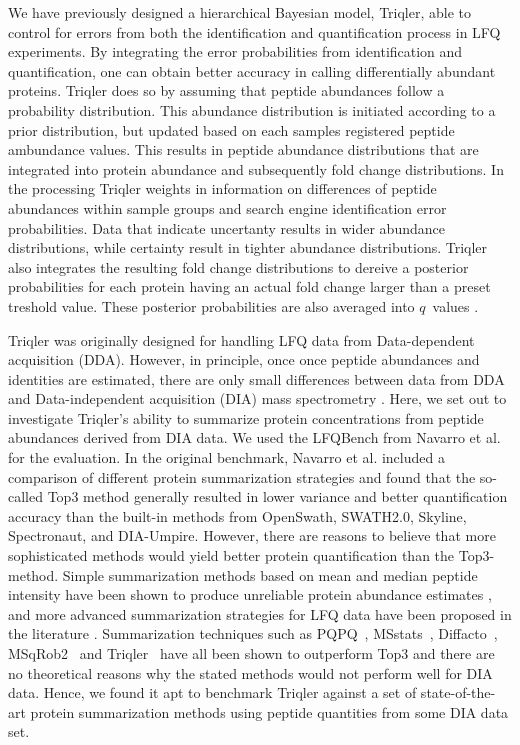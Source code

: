 \documentclass[10pt,letterpaper]{article}
\begin{document}
We have previously designed a hierarchical Bayesian model, Triqler, able to control for errors from both the identification and quantification process in LFQ experiments\cite{the2019integrated}. By integrating the error probabilities from identification and quantification, one can obtain better accuracy in calling differentially abundant proteins. Triqler does so by assuming that peptide abundances follow a probability distribution. This abundance distribution is initiated according to a prior distribution, but updated based on each samples registered peptide ambundance values. This results in peptide abundance distributions that are integrated into protein abundance and subsequently fold change distributions. In the processing Triqler weights in information on differences of peptide abundances within sample groups and search engine identification error probabilities. Data that indicate uncertanty results in wider abundance distributions, while certainty result in tighter abundance distributions. Triqler also integrates the resulting fold change distributions to dereive a posterior probabilities for each protein having an actual fold change larger than a preset treshold value. These posterior probabilities are also averaged into $q$~values \cite{the2019integrated}.

Triqler was originally designed for handling LFQ data from Data-dependent acquisition (DDA). However, in principle, once once peptide abundances and identities are estimated, there are only small differences between data from DDA and Data-independent acquisition (DIA) mass spectrometry \cite{venable2004automated}. Here, we set out to investigate Triqler's ability to summarize protein concentrations from peptide abundances derived from DIA data. We used the LFQBench from Navarro et al. \cite{navarro2016multicenter} for the evaluation. In the original benchmark, Navarro et al. included a comparison of different protein summarization strategies and found that the so-called Top3 method generally resulted in lower variance and better quantification accuracy than the built-in methods from OpenSwath, SWATH2.0, Skyline, Spectronaut, and DIA-Umpire\cite{navarro2016multicenter}. However, there are reasons to believe that more sophisticated methods would yield better protein quantification than the Top3-method. Simple summarization methods based on mean and median peptide intensity have been shown to produce unreliable protein abundance estimates \cite{goeminne2015summarization}, and more advanced summarization strategies for LFQ data have been proposed in the literature \cite{silva2006absolute,cox2014accurate}. Summarization techniques such as PQPQ~\cite{forshed2011enhanced}, MSstats~\cite{choi2014msstats}, Diffacto~\cite{zhang2017covariation}, MSqRob2~\cite{sticker2020robust} and Triqler~\cite{the2019integrated} have all been shown to outperform Top3 and there are no theoretical reasons why the stated methods would not perform well for DIA data. Hence, we found it apt to benchmark Triqler against a set of state-of-the-art protein summarization methods using peptide quantities from some DIA data set.
 
\end{document}
